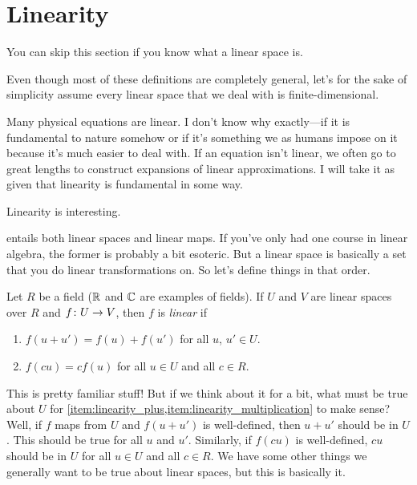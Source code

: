 \documentclass[english, 12pt]{article}
\begin{document}
\section{Linearity}%
\label{sec:linearity}

You can skip this section if you know what a linear space is.

Even though most of these definitions are completely general, let's for the sake of simplicity assume every linear space that we deal with is finite-dimensional.

Many physical equations are linear.
I don't know why exactly---if it is fundamental to nature somehow or if it's something we as humans impose on it because it's much easier to deal with.
If an equation isn't linear, we often go to great lengths to construct expansions of linear approximations.
I will take it as given that linearity is fundamental in some way.
\begin{axiom}\label{ax:linearity}
	Linearity is interesting.
\end{axiom}
 entails both linear spaces and linear maps.
If you've only had one course in linear algebra, the former is probably a bit esoteric.
But a linear space is basically a set that you do linear transformations on.
So let's define things in that order.
\begin{definition}\label{def:linear_map}
	Let \(R\) be a field (\(\mathbb{R}\) and \(\mathbb{C}\) are examples of fields).
	If \(U\) and \(V\) are linear spaces over \(R\) and \(f \colon U \to V\), then \(f\) is \emph{linear} if
	\begin{enumerate}
		\item $f(u + u') = f(u) + f(u')$ for all \(u\), \(u' \in U\).%
		\label{item:linearity_plus}
		\item \(f(c u) = c f(u)\) for all \(u \in U\) and all \(c \in R\).%
		\label{item:linearity_multiplication}
	\end{enumerate}
\end{definition}
This is pretty familiar stuff!
But if we think about it for a bit, what must be true about \(U\) for \cref{item:linearity_plus,item:linearity_multiplication} to make sense?
Well, if \(f\) maps from \(U\) and \(f(u + u')\) is well-defined, then \(u + u'\) should be in \(U\).
This should be true for all \(u\) and \(u'\).
Similarly, if \(f(c u)\) is well-defined, \(c u\) should be in \(U\) for all \(u \in U\) and all \(c \in R\).
We have some other things we generally want to be true about linear spaces, but this is basically it.
\end{document}
